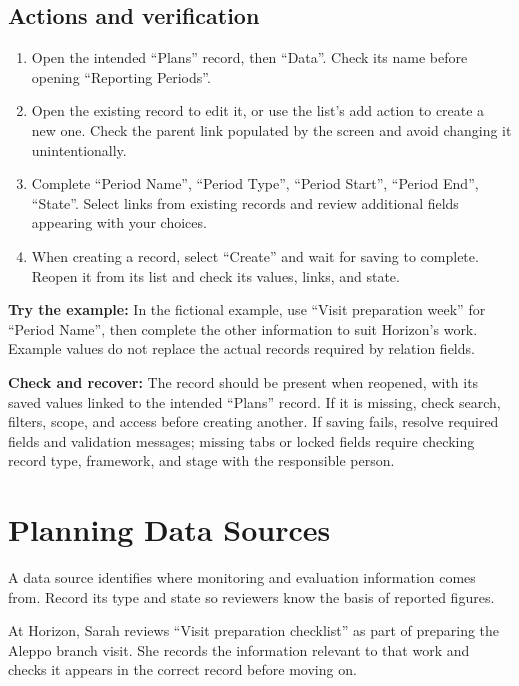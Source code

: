 \subsection{Actions and verification}
\begin{enumerate}
\item Open the intended “Plans” record, then “Data”. Check its name before opening “Reporting Periods”.
\item Open the existing record to edit it, or use the list's add action to create a new one. Check the parent link populated by the screen and avoid changing it unintentionally.
\item Complete “Period Name”, “Period Type”, “Period Start”, “Period End”, “State”. Select links from existing records and review additional fields appearing with your choices.
\item When creating a record, select “Create” and wait for saving to complete. Reopen it from its list and check its values, links, and state.
\end{enumerate}

\textbf{Try the example:} In the fictional example, use “Visit preparation week” for “Period Name”, then complete the other information to suit Horizon's work. Example values do not replace the actual records required by relation fields.

\textbf{Check and recover:} The record should be present when reopened, with its saved values linked to the intended “Plans” record. If it is missing, check search, filters, scope, and access before creating another. If saving fails, resolve required fields and validation messages; missing tabs or locked fields require checking record type, framework, and stage with the responsible person.

\clearpage
\section{Planning Data Sources}
\label{sec:projects-feature-planning-data-sources}

A data source identifies where monitoring and evaluation information comes from. Record its type and state so reviewers know the basis of reported figures.

\begin{rcnote}
At Horizon, Sarah reviews “Visit preparation checklist” as part of preparing the Aleppo branch visit. She records the information relevant to that work and checks it appears in the correct record before moving on.
\end{rcnote}

